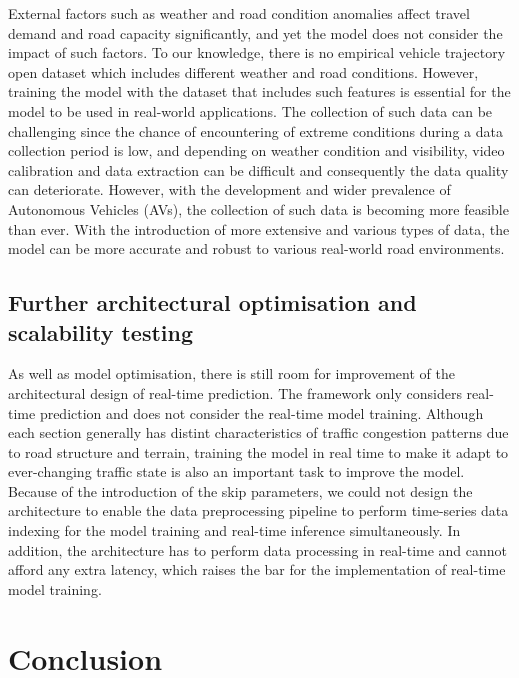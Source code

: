 \documentclass[11pt]{uonthesis}
\begin{document}
External factors such as weather and road condition anomalies affect travel demand and road capacity significantly\cite{WANG2023107044}, and yet the model does not consider the impact of such factors. To our knowledge, there is no empirical vehicle trajectory open dataset which includes different weather and road conditions. However, training the model with the dataset that includes such features is essential for the model to be used in real-world applications. The collection of such data can be challenging since the chance of encountering of extreme conditions during a data collection period is low, and depending on weather condition and visibility, video calibration and data extraction can be difficult and consequently the data quality can deteriorate. However, with the development and wider prevalence of Autonomous Vehicles (AVs), the collection of such data is becoming more feasible than ever. With the introduction of more extensive and various types of data, the model can be more accurate and robust to various real-world road environments. 

\section{Further architectural optimisation and scalability testing}

As well as model optimisation, there is still room for improvement of the architectural design of real-time prediction. The framework only considers real-time prediction and does not consider the real-time model training. Although each section generally has distint characteristics of traffic congestion patterns due to road structure and terrain, training the model in real time to make it adapt to ever-changing traffic state is also an important task to improve the model. Because of the introduction of the skip parameters, we could not design the architecture to enable the data preprocessing pipeline to perform time-series data indexing for the model training and real-time inference simultaneously. In addition, the architecture has to perform data processing in real-time and cannot afford any extra latency, which raises the bar for the implementation of real-time model training.

\chapter{Conclusion}


\end{document}
